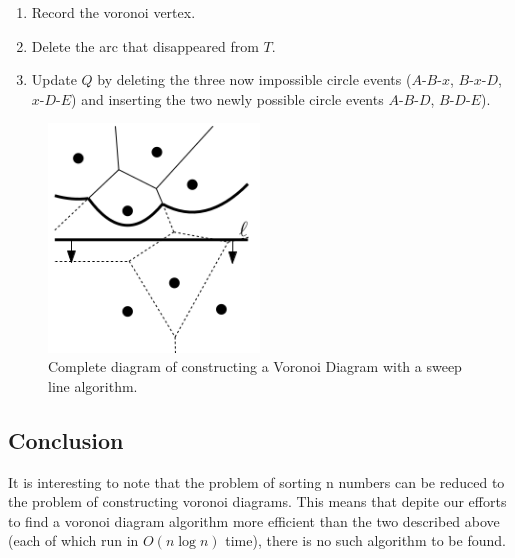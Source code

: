 \documentclass[12pt]{article}
\begin{document}
{\begin{enumerate}
\begin{enumerate}
            \begin{enumerate}

                \item Record the voronoi vertex.

                \item Delete the arc that disappeared from $T$.

                \item Update $Q$ by deleting the three now impossible circle events ($A$-$B$-$x$,
                $B$-$x$-$D$, $x$-$D$-$E$) and inserting the two newly possible circle events 
                $A$-$B$-$D$, $B$-$D$-$E$).

            \end{enumerate}

        \end{enumerate}

    \end{enumerate}
    \hrulefill}


\begin{figure}[h]
    \centering
    \includegraphics[width=0.5\textwidth]{beach.png}
    \caption{Complete diagram of constructing a Voronoi Diagram with a sweep line algorithm.}
\end{figure}

\subsection{Conclusion}

It is interesting to note that the problem of sorting n numbers can be
reduced to the problem of constructing voronoi diagrams.  This means that
depite our efforts to find a voronoi diagram algorithm more efficient
than the two described above (each of which run in $O(n \log n)$ time), there 
is no such algorithm to be found.
\end{document}
